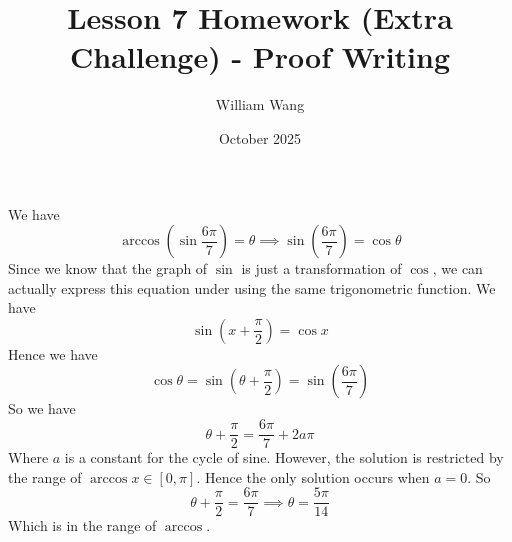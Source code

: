 \documentclass{article}
\title{Lesson 7 Homework (Extra Challenge) - Proof Writing}
\author{William Wang}
\date{October 2025}
\begin{document}
\maketitle

\section{}
We have
\[\arccos(\sin \frac{6\pi}{7}) = \theta \implies \sin(\frac{6\pi}{7}) = \cos \theta\]
Since we know that the graph of $\sin$ is just a transformation of $\cos$, we can actually express this equation under using the same trigonometric function. We have 
\[\sin(x+\frac{\pi}{2}) = \cos x\]
Hence we have 
\[\cos \theta = \sin(\theta + \frac{\pi}{2}) = \sin(\frac{6\pi}{7})\]
So we have 
\[\theta + \frac{\pi}{2} = \frac{6\pi}{7} + 2a\pi\]
Where \(a\) is a constant for the cycle of sine. However, the solution is restricted by the range of \(\arccos x \in [0, \pi] \). Hence the only solution occurs when $a = 0$. So
\[\theta +\frac{\pi}{2} = \frac{6\pi}{7} \implies \theta = \frac{5\pi}{14}\]
Which is in the range of $\arccos$. 
\end{document}
